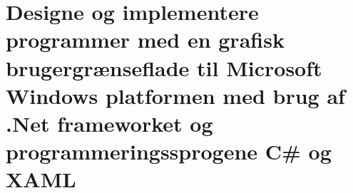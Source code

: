 \section{Designe og implementere programmer med en grafisk brugergrænseflade til Microsoft Windows platformen med brug af .Net frameworket og programmeringssprogene C\# og XAML}